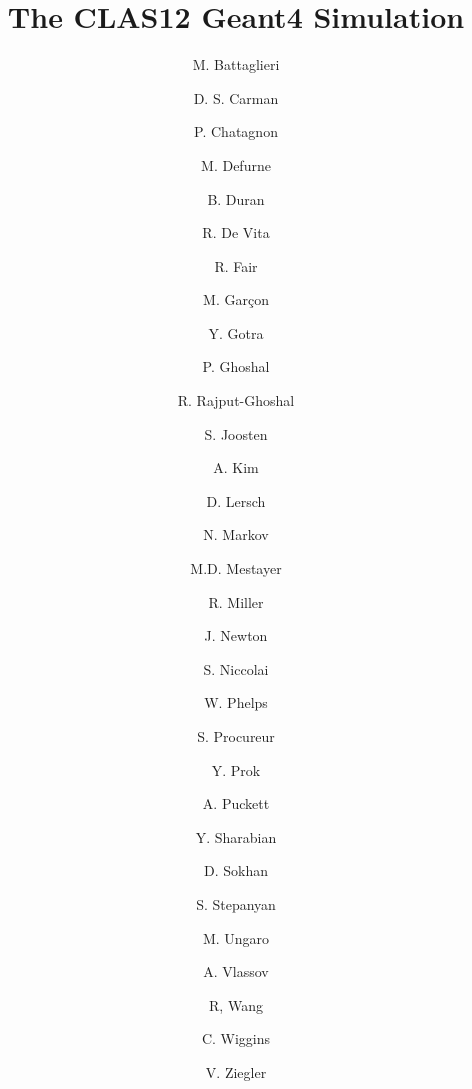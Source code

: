 \title{The CLAS12 Geant4 Simulation}




\author[B]{M. Battaglieri}
\author[A]{D. S. Carman}
\author[E]{P. Chatagnon}
\author[C]{M. Defurne}
\author[K]{B. Duran}
\author[B]{R. De Vita}
\author[A]{R. Fair}
\author[C]{M. Gar\c con}
\author[A]{Y. Gotra}
\author[A]{P. Ghoshal}
\author[A]{R. Rajput-Ghoshal}
\author[K]{S. Joosten}
\author[D]{A. Kim}
\author[J]{D. Lersch}
\author[D]{N. Markov}
\author[A]{M.D. Mestayer}
\author[A]{R. Miller}
\author[H]{J. Newton}
\author[E]{S. Niccolai}
\author[L]{W. Phelps}
\author[C]{S. Procureur}
\author[H, I]{Y. Prok}
\author[D]{A. Puckett}
\author[A]{Y. Sharabian}
\author[F]{D. Sokhan}
\author[A]{S. Stepanyan}
\author[A]{M. Ungaro}
\author[G]{A. Vlassov}
\author[E]{R, Wang}
\author[A]{C. Wiggins}
\author[A]{V. Ziegler}

\address[A]{Thomas Jefferson National Accelerator Facility, Newport News, VA, USA}
\address[B]{Istituto Nazionale Di Fisica Nucleare, Genova, Italy}
\address[C]{IRFU, CEA, Universit\'e Paris-Saclay, F-91191 Gif-sur-Yvette, France}
\address[D]{University of Connecticut, Storrs, Connecticut}
\address[E]{Institut de Physique Nuclaire, CNRS-IN2P3, Univ. Paris-Sud, Universit Paris-Saclay, 91406 Orsay Cedex, France}
\address[F]{University of Glasgow, Glasgow G12 8QQ, United Kingdom }
\address[G]{Institute For Theoretical and Experimental Physics, Moscow, Russia}
\address[H]{Old Dominion University, Norfolk, VA, USA}
\address[I]{Virginia Commonwealth University, Richmond, VA, USA}
\address[J]{Florida State University, Tallahassee, FL, USA}
\address[K]{Temple University, Philadelphia, PA, USA}
\address[L]{George Washington University, Washington, DC, USA}
